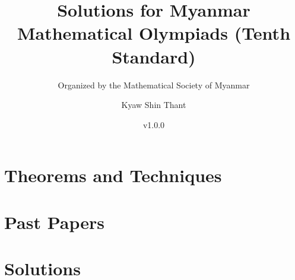 \documentclass[11pt, dvipsnames]{scrbook}
\begin{document}
\title{Solutions for Myanmar Mathematical Olympiads (Tenth Standard)}
\subtitle{Organized by the Mathematical Society of Myanmar}
\author{Kyaw Shin Thant}
\date{v1.0.0}

\pagestyle{scrplain}
\frontmatter
\maketitle



\mainmatter
\pagestyle{scrheadings}
\tableofcontents
\part{Theorems and Techniques}





\part{Past Papers}












\part{Solutions}











\end{document}
